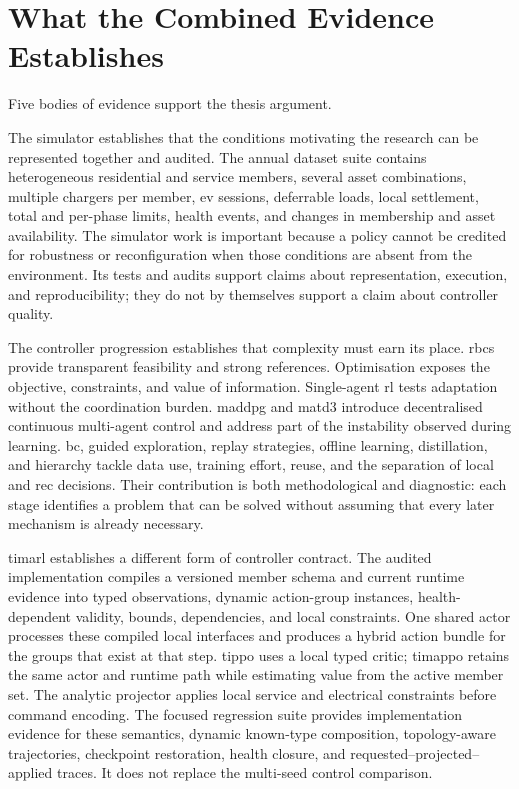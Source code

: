 \clearpage

\section{What the Combined Evidence Establishes}
\label{sec:discussion-argument}
\label{sec:discussion-synthesis}

Five bodies of evidence support the thesis argument.

The simulator establishes that the conditions motivating the research can be represented together and audited. The annual dataset suite contains heterogeneous residential and service members, several asset combinations, multiple chargers per member, \gls{ev} sessions, deferrable loads, local settlement, total and per-phase limits, health events, and changes in membership and asset availability. The simulator work is important because a policy cannot be credited for robustness or reconfiguration when those conditions are absent from the environment. Its tests and audits support claims about representation, execution, and reproducibility; they do not by themselves support a claim about controller quality.

The controller progression establishes that complexity must earn its place. \glspl{rbc} provide transparent feasibility and strong references. Optimisation exposes the objective, constraints, and value of information. Single-agent \gls{rl} tests adaptation without the coordination burden. \gls{maddpg} and \gls{matd3} introduce decentralised continuous multi-agent control and address part of the instability observed during learning. \gls{bc}, guided exploration, replay strategies, offline learning, distillation, and hierarchy tackle data use, training effort, reuse, and the separation of local and \gls{rec} decisions. Their contribution is both methodological and diagnostic: each stage identifies a problem that can be solved without assuming that every later mechanism is already necessary.

\gls{timarl} establishes a different form of controller contract. The audited implementation compiles a versioned member schema and current runtime evidence into typed observations, dynamic action-group instances, health-dependent validity, bounds, dependencies, and local constraints. One shared actor processes these compiled local interfaces and produces a hybrid action bundle for the groups that exist at that step. \gls{tippo} uses a local typed critic; \gls{timappo} retains the same actor and runtime path while estimating value from the active member set. The analytic projector applies local service and electrical constraints before command encoding. The focused regression suite provides implementation evidence for these semantics, dynamic known-type composition, topology-aware trajectories, checkpoint restoration, health closure, and requested--projected--applied traces. It does not replace the multi-seed control comparison.

